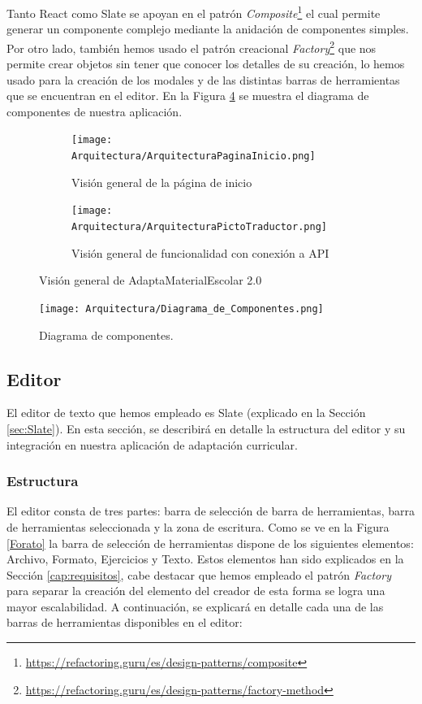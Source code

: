 Tanto React como Slate se apoyan en el patrón \textit{Composite}\footnote{\url{https://refactoring.guru/es/design-patterns/composite}} el cual permite generar un componente complejo mediante la anidación de componentes simples. Por otro lado, también hemos usado el patrón creacional \textit{Factory}\footnote{\url{https://refactoring.guru/es/design-patterns/factory-method}} que nos permite crear objetos sin tener que conocer los detalles de su creación, lo hemos usado para la creación de los modales y de las distintas barras de herramientas que se encuentran en el editor. En la Figura \ref{fig:diagramaComponentes} se muestra el diagrama de componentes de nuestra aplicación.
\begin{figure}[ht!]
  \centering
  \begin{subfigure}{\textwidth}
    \centering
    \texttt{[image: Arquitectura/ArquitecturaPaginaInicio.png]}
    \caption{Visión general de la página de inicio}
    \label{fig:arquitecturageneral1}
  \end{subfigure}

  \begin{subfigure}{\textwidth}
    \centering
    \texttt{[image: Arquitectura/ArquitecturaPictoTraductor.png]}
    \caption{Visión general de funcionalidad con conexión a API}
    \label{fig:arquitecturageneral2}
  \end{subfigure}
  \caption{Visión general de AdaptaMaterialEscolar 2.0}
  \label{fig:arquitecturageneral}
\end{figure}

\begin{figure}[ht!]
  \centering
  \texttt{[image: Arquitectura/Diagrama\_de\_Componentes.png]}
  \caption{Diagrama de componentes.}
  \label{fig:diagramaComponentes}
\end{figure}

\subsection{Editor}
\label{Editor}
El editor de texto que hemos empleado es Slate (explicado en la Sección \ref{sec:Slate}). En esta sección, se describirá en detalle la estructura del editor y su integración en nuestra aplicación de adaptación curricular.

\subsubsection{Estructura}
El editor consta de tres partes: barra de selección de barra de herramientas, barra de herramientas seleccionada y la zona de escritura. Como se ve en la Figura \ref{Forato} la barra de selección de herramientas dispone de los siguientes elementos: Archivo, Formato, Ejercicios y Texto. Estos elementos han sido explicados en la Sección \ref{cap:requisitos}, cabe destacar que hemos empleado el patrón \textit{Factory} para separar la creación del elemento del creador de esta forma se logra una mayor escalabilidad.
A continuación, se explicará en detalle cada una de las barras de herramientas disponibles en el editor:

